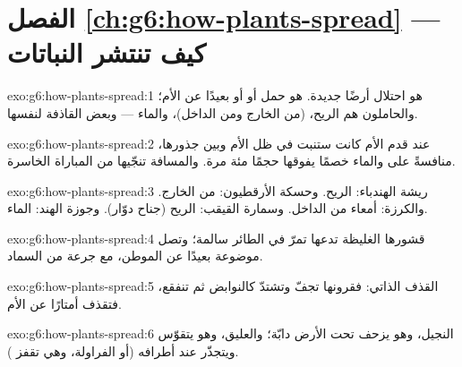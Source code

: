 \section*{الفصل \ref{ch:g6:how-plants-spread} --- كيف تنتشر النباتات}

\begin{solution}{exo:g6:how-plants-spread:1}
 هو احتلال  أرضًا جديدة.  هو حمل  أو
 أو  بعيدًا عن الأم؛ والحاملون هم الريح، 
(من الخارج ومن الداخل)، والماء --- وبعض  القاذفة لنفسها.
\end{solution}

\begin{solution}{exo:g6:how-plants-spread:2}
عند قدم الأم كانت ستنبت في ظل الأم وبين جذورها، منافسةً على 
والماء خصمًا يفوقها حجمًا مئة مرة. والمسافة تنجّيها من المباراة
الخاسرة.
\end{solution}

\begin{solution}{exo:g6:how-plants-spread:3}
ريشة الهندباء: الريح. وحسكة الأرقطيون:   من الخارج.
والكرزة: أمعاء  من الداخل. وسمارة القيقب: الريح (جناح
دوّار). وجوزة الهند: الماء.
\end{solution}

\begin{solution}{exo:g6:how-plants-spread:4}
قشورها الغليظة تدعها تمرّ في  الطائر سالمة؛ وتصل موضوعة بعيدًا
عن الموطن، مع جرعة من السماد.
\end{solution}

\begin{solution}{exo:g6:how-plants-spread:5}
القذف الذاتي: فقرونها تجفّ وتشتدّ كالنوابض ثم تنفقع، فتقذف 
أمتارًا عن الأم.
\end{solution}

\begin{solution}{exo:g6:how-plants-spread:6}
النجيل، وهو يزحف تحت الأرض  دابّة؛ والعليق، وهو يتقوّس
ويتجذّر عند أطرافه (أو الفراولة، وهي تقفز ).
\end{solution}

